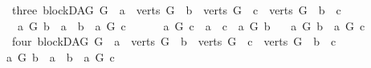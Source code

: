 \begin{isabellebody}
\ \ {\isacharbar}{\kern0pt}\ {\isacharparenleft}{\kern0pt}three{\isacharparenright}{\kern0pt}\ {\isachardoublequoteopen}{\isacharparenleft}{\kern0pt}blockDAG\ G\ {\isasymand}\ a\ {\isasymin}\ verts\ G\ {\isasymand}\ b\ {\isasymin}\ verts\ G\ {\isasymand}\ c\ {\isasymin}\ verts\ G{\isacharparenright}{\kern0pt}\ {\isasymand}\ b\ {\isasymnoteq}\ c\ \isanewline
\ \ \ {\isasymand}\ {\isasymnot}{\isacharparenleft}{\kern0pt}{\isacharparenleft}{\kern0pt}{\isacharparenleft}{\kern0pt}a\ {\isasymrightarrow}\isactrlsup {\isacharplus}{\kern0pt}\isactrlbsub G\isactrlesub \ b{\isacharparenright}{\kern0pt}\ {\isasymor}\ a\ {\isacharequal}{\kern0pt}\ b{\isacharparenright}{\kern0pt}\ {\isasymand}\ {\isasymnot}{\isacharparenleft}{\kern0pt}a\ {\isasymrightarrow}\isactrlsup {\isacharplus}{\kern0pt}\isactrlbsub G\isactrlesub \ c{\isacharparenright}{\kern0pt}{\isacharparenright}{\kern0pt}\ {\isasymand}\ \ \isanewline
\ \ \ {\isasymnot}{\isacharparenleft}{\kern0pt}{\isacharparenleft}{\kern0pt}{\isacharparenleft}{\kern0pt}a\ {\isasymrightarrow}\isactrlsup {\isacharplus}{\kern0pt}\isactrlbsub G\isactrlesub \ c{\isacharparenright}{\kern0pt}\ {\isasymor}\ a\ {\isacharequal}{\kern0pt}\ c{\isacharparenright}{\kern0pt}\ {\isasymand}\ {\isasymnot}{\isacharparenleft}{\kern0pt}a\ {\isasymrightarrow}\isactrlsup {\isacharplus}{\kern0pt}\isactrlbsub G\isactrlesub \ b{\isacharparenright}{\kern0pt}{\isacharparenright}{\kern0pt}{\isasymand}\ \isanewline
\ \ {\isacharparenleft}{\kern0pt}{\isacharparenleft}{\kern0pt}a\ {\isasymrightarrow}\isactrlsup {\isacharplus}{\kern0pt}\isactrlbsub G\isactrlesub \ b{\isacharparenright}{\kern0pt}\ {\isasymand}\ {\isacharparenleft}{\kern0pt}a\ {\isasymrightarrow}\isactrlsup {\isacharplus}{\kern0pt}\isactrlbsub G\isactrlesub \ c{\isacharparenright}{\kern0pt}{\isacharparenright}{\kern0pt}{\isachardoublequoteclose}\isanewline
\ \ {\isacharbar}{\kern0pt}\ {\isacharparenleft}{\kern0pt}four{\isacharparenright}{\kern0pt}\ {\isachardoublequoteopen}{\isacharparenleft}{\kern0pt}blockDAG\ G\ {\isasymand}\ a\ {\isasymin}\ verts\ G\ {\isasymand}\ b\ {\isasymin}\ verts\ G\ {\isasymand}\ c\ {\isasymin}\ verts\ G{\isacharparenright}{\kern0pt}\ {\isasymand}\ b\ {\isasymnoteq}\ c\ \ {\isasymand}\isanewline
\ \ {\isasymnot}{\isacharparenleft}{\kern0pt}{\isacharparenleft}{\kern0pt}{\isacharparenleft}{\kern0pt}a\ {\isasymrightarrow}\isactrlsup {\isacharplus}{\kern0pt}\isactrlbsub G\isactrlesub \ b{\isacharparenright}{\kern0pt}\ {\isasymor}\ a\ {\isacharequal}{\kern0pt}\ b{\isacharparenright}{\kern0pt}\ {\isasymand}\ {\isasymnot}{\isacharparenleft}{\kern0pt}a\ {\isasymrightarrow}\isactrlsup {\isacharplus}{\kern0pt}\isactrlbsub G\isactrlesub \ c{\isacharparenright}{\kern0pt}{\isacharparenright}{\kern0pt}\ {\isasymand}\ \ \isanewline

\end{isabellebody}
